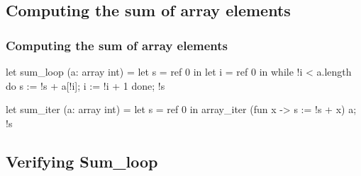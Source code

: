 \subsection*{Computing the sum of array elements}
\begin{frame}[fragile]\frametitle{Computing the sum of array elements}
\begin{adjustwidth}{-0.7cm}{1.5cm}
\begin{footnotesize}
\begin{minipage}[t]{0.4\textwidth}
\begin{whycode}  
 let sum_loop (a: array int) 	
 = let s = ref 0 in
   let i = ref 0 in
   while !i < a.length do
     s := !s + a[!i];
     i := !i + 1
   done; 
   !s 
\end{whycode}
\end{minipage}\hfill
\begin{minipage}[t]{0.4\textwidth}
\begin{whycode} 
  let sum_iter (a: array int)
  = let s = ref 0 in
    array_iter (fun x -> s := !s + x) a;  
    !s
\end{whycode}	
\end{minipage}
\end{footnotesize}
\end{adjustwidth}
\end{frame}

\subsection*{Verifying Sum_loop}
